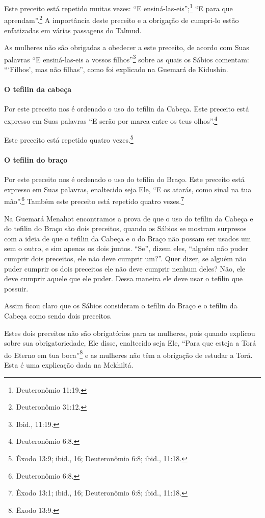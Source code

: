 Este preceito está repetido muitas vezes: ``E ensiná-las-eis'';\footnote{Deuteronômio 11:19.} ``E para que aprendam''.\footnote{Deuteronômio 31:12.} A
importância deste preceito e a obrigação de cumpri-lo estão enfatizadas
em várias passagens do Talmud.

As mulheres não são obrigadas a obedecer a este preceito, de acordo com
Suas palavras ``E ensiná-las-eis a vossos filhos''\footnote{Ibid., 11:19.} sobre
as quais os Sábios comentam: ```Filhos', mas não filhas'', como foi
explicado na Guemará de Kidushin.

\paragraph{O tefilin da cabeça}

Por este preceito nos é ordenado o uso do tefilin da Cabeça. Este
preceito está expresso em Suas palavras ``E serão por marca entre os
teus olhos''.\footnote{Deuteronômio 6:8.}

Este preceito está repetido quatro vezes.\footnote{Êxodo 13:9; ibid., 16;
Deuteronômio 6:8; ibid., 11:18.}

\paragraph{O tefilin do braço}

Por este preceito nos é ordenado o uso do tefilin do Braço. Este
preceito está expresso em Suas palavras, enaltecido seja Ele, ``E os
atarás, como sinal na tua mão''.\footnote{Deuteronômio 6:8.} Também este preceito
está repetido quatro vezes.\footnote{Êxodo 13:1; ibid., 16; Deuteronômio 6:8;
ibid., 11:18.}

Na Guemará Menahot encontramos a prova de que o uso do tefilin da
Cabeça e do tefilin do Braço são dois preceitos, quando os Sábios se
mostram surpresos com a ideia de que o tefilin da Cabeça e o do
Braço não possam ser usados um sem o outro, e sim apenas os dois juntos.
``Se'', dizem eles, ``alguém não puder cumprir dois preceitos, ele não
deve cumprir um?''. Quer dizer, se alguém não puder cumprir os dois
preceitos ele não deve cumprir nenhum deles? Não, ele deve cumprir
aquele que ele puder. Dessa maneira ele deve usar o tefilin que
possuir.

Assim ficou claro que os Sábios consideram o tefilin do Braço e o
tefilin da Cabeça como sendo dois preceitos.

Estes dois preceitos não são obrigatórios para as mulheres, pois quando
explicou sobre sua obrigatoriedade, Ele disse, enaltecido seja Ele,
``Para que esteja a Torá do Eterno em tua boca''\footnote{Êxodo 13:9.} e as
mulheres não têm a obrigação de estudar a Torá. Esta é uma explicação
dada na Mekhiltá.

